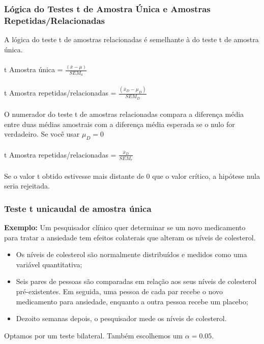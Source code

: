 \documentclass[11pt]{beamer}
\begin{document}
\begin{frame}
\frametitle{Lógica do Testes t de Amostra Única e Amostras Repetidas/Relacionadas}
A lógica do teste t de amostras relacionadas é semelhante à do teste t de amostra única.\\~\\

t Amostra única = $\frac{(\bar{x} - \mu)}{SEM_a}$\\~\\

t Amostra repetidas/relacionadas = $\frac{(\bar{x}_D - \mu_D)}{SEM_D}$\\~\\

O numerador do teste t de amostras relacionadas compara a diferença média entre duas médias amostrais com a diferença média esperada se o nulo for verdadeiro. Se você usar $\mu_D = 0$\\~\\

t Amostra repetidas/relacionadas = $\frac{\bar{x}_D}{SEM_r}$\\~\\

Se o valor t obtido estivesse mais distante de 0 que o valor crítico, a hipótese nula seria rejeitada.

\end{frame}

\begin{frame}
\frametitle{Teste t unicaudal de amostra única}

\textbf{Exemplo:} Um pesquisador clínico quer determinar se um novo medicamento para tratar a ansiedade tem efeitos colaterais que alteram os níveis de colesterol. 
 
\begin{itemize}
\item Os níveis de colesterol são normalmente distribuídos e medidos como uma variável quantitativa;
\item
   Seis pares de pessoas são comparadas em relação aos seus níveis de colesterol pré-existentes. Em seguida, uma pessoa de cada par recebe o novo medicamento para ansiedade, enquanto a outra pessoa recebe um placebo;
\item
  Dezoito semanas depois, o pesquisador mede os níveis de colesterol.
\end{itemize}

Optamos por um teste bilateral. Também escolhemos um \(\alpha=0.05\).

\end{frame}
\end{document}
